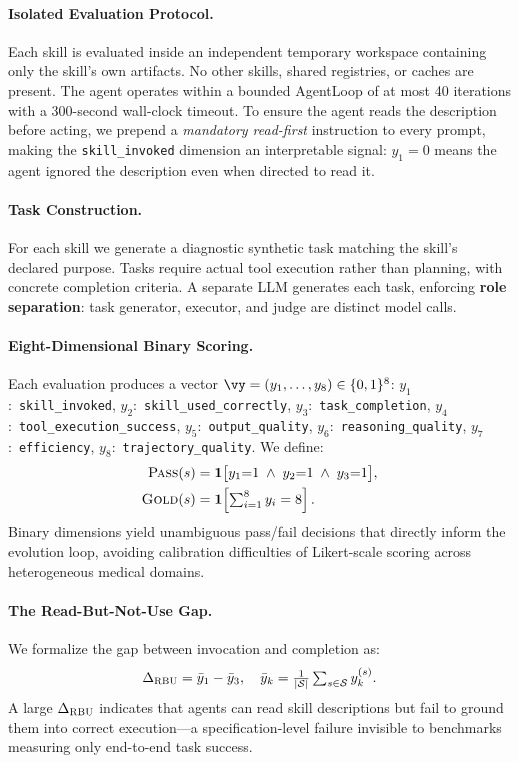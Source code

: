 \paragraph{Isolated Evaluation Protocol.}
Each skill is evaluated inside an independent temporary workspace containing only the skill's own artifacts.
No other skills, shared registries, or caches are present.
The agent operates within a bounded AgentLoop of at most 40 iterations with a 300-second wall-clock timeout.
To ensure the agent reads the description before acting, we prepend a \emph{mandatory read-first} instruction to every prompt, making the \texttt{skill\_invoked} dimension an interpretable signal: $y_1=0$ means the agent ignored the description even when directed to read it.

\paragraph{Task Construction.}
For each skill we generate a diagnostic synthetic task matching the skill's declared purpose.
Tasks require actual tool execution rather than planning, with concrete completion criteria.
A separate LLM generates each task, enforcing \textbf{role separation}: task generator, executor, and judge are distinct model calls.

\paragraph{Eight-Dimensional Binary Scoring.}
Each evaluation produces a vector $\vy = (y_1, \ldots, y_8) \in \{0,1\}^8$:
$y_1$:~\texttt{skill\_invoked},
$y_2$:~\texttt{skill\_used\_correctly},
$y_3$:~\texttt{task\_completion},
$y_4$:~\texttt{tool\_execution\_success},
$y_5$:~\texttt{output\_quality},
$y_6$:~\texttt{reasoning\_quality},
$y_7$:~\texttt{efficiency},
$y_8$:~\texttt{trajectory\_quality}.
We define:
\begin{align}
    \textsc{Pass}(s) &= \mathbf{1}\bigl[y_1{=}1 \;\wedge\; y_2{=}1 \;\wedge\; y_3{=}1\bigr], \label{eq:pass} \\
    \textsc{Gold}(s) &= \mathbf{1}\!\left[\textstyle\sum_{i=1}^{8} y_i = 8\right]. \label{eq:gold}
\end{align}
Binary dimensions yield unambiguous pass/fail decisions that directly inform the evolution loop, avoiding calibration difficulties of Likert-scale scoring across heterogeneous medical domains.

\paragraph{The Read-But-Not-Use Gap.}
We formalize the gap between invocation and completion as:
\begin{equation}
    \Delta_{\textsc{RBU}} = \bar{y}_1 - \bar{y}_3, \quad
    \bar{y}_k = \tfrac{1}{|\mathcal{S}|}\textstyle\sum_{s \in \mathcal{S}} y_k^{(s)}.
    \label{eq:rbu}
\end{equation}
A large $\Delta_{\textsc{RBU}}$ indicates that agents can read skill descriptions but fail to ground them into correct execution---a specification-level failure invisible to benchmarks measuring only end-to-end task success.

